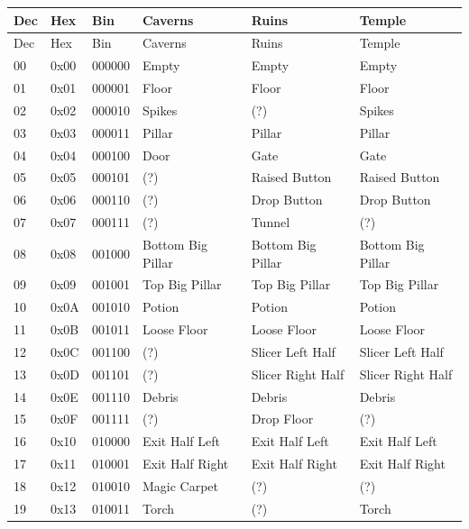 \documentclass{article}
\begin{document}
\renewcommand{\tabcolsep}{0.2em}
\begin{longtable}{llllll}
  \hline
 Dec& Hex  & Bin    & Caverns            & Ruins             & Temple \\
  \hline
 \endfirsthead
  \hline
 Dec& Hex  & Bin    & Caverns            & Ruins             & Temple \\
  \hline
 \endhead
 00 & 0x00 & 000000 & Empty              & Empty             & Empty \\
 01 & 0x01 & 000001 & Floor              & Floor             & Floor \\
 02 & 0x02 & 000010 & Spikes             & (?)               & Spikes \\
 03 & 0x03 & 000011 & Pillar             & Pillar            & Pillar \\
 04 & 0x04 & 000100 & Door               & Gate              & Gate \\
 05 & 0x05 & 000101 & (?)                & Raised Button     & Raised Button \\
 06 & 0x06 & 000110 & (?)                & Drop Button       & Drop Button \\
 07 & 0x07 & 000111 & (?)                & Tunnel            & (?) \\
 08 & 0x08 & 001000 & Bottom Big Pillar  & Bottom Big Pillar & Bottom Big Pillar \\
 09 & 0x09 & 001001 & Top Big Pillar     & Top Big Pillar    & Top Big Pillar \\
 10 & 0x0A & 001010 & Potion             & Potion            & Potion \\
 11 & 0x0B & 001011 & Loose Floor        & Loose Floor       & Loose Floor \\
 12 & 0x0C & 001100 & (?)                & Slicer Left Half  & Slicer Left Half \\
 13 & 0x0D & 001101 & (?)                & Slicer Right Half & Slicer Right Half \\
 14 & 0x0E & 001110 & Debris             & Debris            & Debris \\
 15 & 0x0F & 001111 & (?)                & Drop Floor        & (?) \\
 16 & 0x10 & 010000 & Exit Half Left     & Exit Half Left    & Exit Half Left \\
 17 & 0x11 & 010001 & Exit Half Right    & Exit Half Right   & Exit Half Right \\
 18 & 0x12 & 010010 & Magic Carpet       & (?)               & (?) \\
 19 & 0x13 & 010011 & Torch              & (?)               & Torch \\

\end{longtable}
\end{document}
